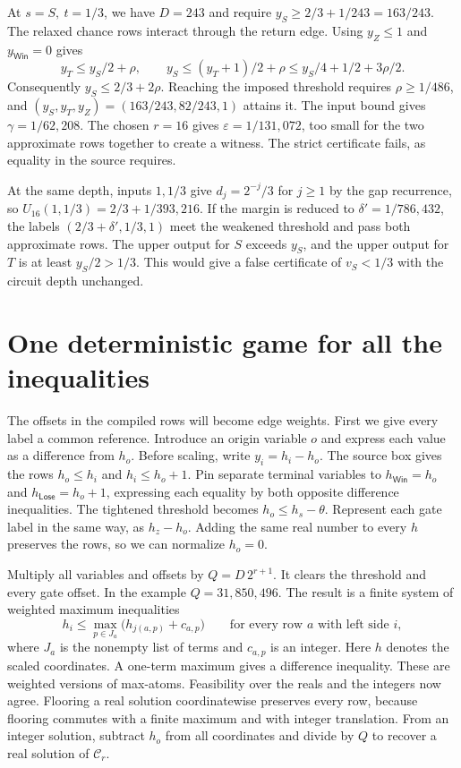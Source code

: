 \documentclass[11pt,letterpaper]{article}
\newcommand{\Win}{\mathsf{Win}}
\newcommand{\Lose}{\mathsf{Lose}}
\newcommand{\compiled}{\mathcal C}
\begin{document}
At \(s=S,\ t=1/3\), we have \(D=243\) and require
\(y_S\ge 2/3+1/243=163/243\). The relaxed chance rows interact through the
return edge. Using \(y_Z\le1\) and \(y_{\Win}=0\) gives
\[
 y_T\le y_S/2+\rho,\qquad
 y_S\le (y_T+1)/2+\rho
      \le y_S/4+1/2+3\rho/2 .
\]
Consequently \(y_S\le2/3+2\rho\). Reaching the imposed threshold requires
\(\rho\ge1/486\), and \((y_S,y_T,y_Z)=(163/243,82/243,1)\) attains it.
The input bound gives \(\gamma=1/62{,}208\). The chosen \(r=16\) gives
\(\varepsilon=1/131{,}072\), too small for the two approximate rows together
to create a witness. The strict certificate fails, as equality in the source
requires.

At the same depth, inputs \(1,1/3\) give \(d_j=2^{-j}/3\) for \(j\ge1\) by the
gap recurrence, so \(U_{16}(1,1/3)=2/3+1/393{,}216\). If the margin is reduced
to \(\delta'=1/786{,}432\), the labels \((2/3+\delta',1/3,1)\) meet the weakened
threshold and pass both approximate rows. The upper output for \(S\) exceeds
\(y_S\), and the upper output for \(T\) is at least \(y_S/2>1/3\). This would
give a false certificate of \(v_S<1/3\) with the circuit depth unchanged.

\section{One deterministic game for all the inequalities}
\label{sec:arena}

The offsets in the compiled rows will become edge weights. First we give
every label a common reference. Introduce an origin variable \(o\) and express
each value as a difference from \(h_o\). Before scaling, write \(y_i=h_i-h_o\).
The source box gives the rows
\(h_o\le h_i\) and \(h_i\le h_o+1\). Pin separate terminal variables to
\(h_{\Win}=h_o\) and \(h_{\Lose}=h_o+1\), expressing each equality by both
opposite difference inequalities. The tightened threshold becomes
\(h_o\le h_s-\theta\). Represent each gate label in the same way, as \(h_z-h_o\).
Adding the same real number to every \(h\) preserves the rows, so we can normalize
\(h_o=0\).

Multiply all variables and offsets by \(Q=D\,2^{r+1}\). It clears the threshold
and every gate offset. In the example \(Q=31{,}850{,}496\). The result is a finite
system of weighted maximum inequalities
\begin{equation}\label{eq:rows}
           h_i\le \max_{p\in J_a}\bigl(h_{j(a,p)}+c_{a,p}\bigr)
           \qquad\text{for every row \(a\) with left side \(i\)},
\end{equation}
where \(J_a\) is the nonempty list of terms and \(c_{a,p}\) is an integer.
Here \(h\) denotes the scaled coordinates. A one-term maximum gives a difference
inequality. These are weighted versions of max-atoms. Feasibility over the reals
and the integers now agree. Flooring a real solution coordinatewise preserves
every row, because flooring commutes with a finite maximum and with integer
translation. From an integer solution, subtract \(h_o\) from all coordinates and
divide by \(Q\) to recover a real solution of \(\compiled_r\).
\end{document}

